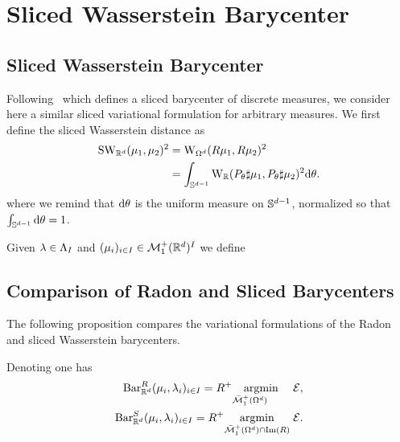 \section{Sliced Wasserstein Barycenter}
\label{sec-sliced-wass}


\subsection{Sliced Wasserstein Barycenter}

Following~\cite{Rabin_ssvm11} which defines a sliced barycenter of discrete measures, we consider here a similar sliced variational formulation for arbitrary measures. We first define the sliced Wasserstein distance as
\begin{align}\label{eq-swass-dist}
	\text{\upshape SW}_{\mathbb{R}^d}(\mu_1,\mu_2)^2 &= \text{\upshape W}_{\Omega^d}( R \mu_1, R \mu_2 )^2 \\
	 &= \int_{\mathbb{S}^{d-1}} \text{\upshape W}_{\mathbb{R}}( P_\theta \sharp \mu_1, P_\theta \sharp \mu_2 )^2  \mathrm{d} \theta.
\end{align}
where we remind that $\mathrm{d} \theta$ is the uniform measure on $\mathbb{S}^{d-1}$, normalized so that $\int_{\mathbb{S}^{d-1}} \mathrm{d} \theta = 1$.
 
\begin{defn}\label{defn-sliced-baryc} Given $\lambda \in \Lambda_I$ and $(\mu_i)_{i \in I} \in \mathcal{M}_1^+(\mathbb{R}^d)^I$ we define
\end{defn}


\subsection{Comparison of Radon and Sliced Barycenters}

The following proposition compares the variational formulations of the Radon and sliced Wasserstein barycenters.

\begin{prop}\label{prop-comparison-bary}
	Denoting 
	one has
	\begin{align}
		\label{eq-comparison-1}
		\text{\upshape Bar}_{\mathbb{R}^d}^R(\mu_i,\lambda_i)_{i \in I} = R^+  \underset{\bar{\mathcal{M}}_1^+(\Omega^d) \qquad }{\operatorname{argmin}}\; &\mathcal{E}, \\
		\label{eq-comparison-2}
		\text{\upshape Bar}_{\mathbb{R}^d}^S(\mu_i,\lambda_i)_{i \in I} = R^+ \underset{\bar{\mathcal{M}}_1^+(\Omega^d) \cap \text{\upshape Im}(R) }{\operatorname{argmin}}\; &\mathcal{E}.
	\end{align}
\end{prop}


